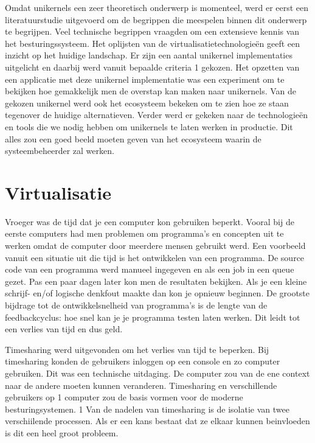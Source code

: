 \documentclass[pdftex,a4paper,12pt,twoside]{report}
\begin{document}
Omdat unikernels een zeer theoretisch onderwerp is momenteel, werd er eerst een literatuurstudie uitgevoerd om de begrippen die meespelen binnen dit onderwerp te begrijpen. Veel technische begrippen vraagden om een extensieve kennis van het besturingssysteem. Het oplijsten van de virtualisatietechnologieën geeft een inzicht op het huidige landschap. Er zijn een aantal unikernel implementaties uitgelicht en daarbij werd vanuit bepaalde criteria 1 gekozen. Het opzetten van een applicatie met deze unikernel implementatie was een experiment om te bekijken hoe gemakkelijk men de overstap kan maken naar unikernels. Van de gekozen unikernel werd ook het ecosysteem bekeken om te zien hoe ze staan tegenover de huidige alternatieven.  Verder werd er gekeken naar de technologieën en tools die we nodig hebben om unikernels te laten werken in productie. Dit alles zou een goed beeld moeten geven van het ecosysteem waarin de systeembeheerder zal werken.


\chapter{Virtualisatie}
\label{ch:virtualisatie}

Vroeger was de tijd dat je een computer kon gebruiken beperkt. Vooral bij de eerste computers had men problemen om programma's en concepten uit te werken omdat de computer door meerdere mensen gebruikt werd. Een voorbeeld vanuit een situatie uit die tijd is het ontwikkelen van een programma. De source code van een programma werd manueel ingegeven en als een job in een queue gezet. Pas een paar dagen later kon men de resultaten bekijken. Als je een kleine schrijf- en/of logische denkfout maakte dan kon je opnieuw beginnen. De grootste bijdrage tot de ontwikkelsnelheid van programma's is de lengte van de feedbackcyclus: hoe snel kan je je programma testen laten werken. Dit leidt tot een verlies van tijd en dus geld.

Timesharing werd uitgevonden om het verlies van tijd te beperken. Bij timesharing konden de gebruikers inloggen op een console en zo computer gebruiken. Dit was een technische uitdaging. De computer zou van de ene context naar de andere moeten kunnen veranderen. Timesharing en verschillende gebruikers op 1 computer zou de basis vormen voor de moderne besturingsystemen. 1 Van de nadelen van timesharing is de isolatie van twee verschiilende processen. Als er een kans bestaat dat ze elkaar kunnen beinvloeden is dit een heel groot probleem.
\end{document}
